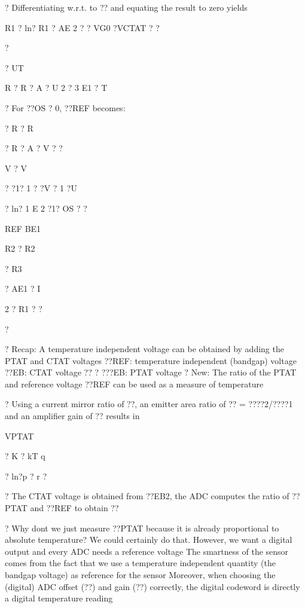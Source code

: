 \documentclass[2pt,landscape]{article}
\begin{document}
\begin{multicols*}{5}
?	Differentiating w.r.t. to ?? and equating the result to zero yields



R1 ? ln? R1 ? AE 2 ? ? VG0 ?VCTAT ? ?

? 


? UT


R	? R ? A	?	U
2	?	3	E1 ?	T



?	For ??OS ? 0, ??REF becomes:


?	R ?	R


? R ? A	?	V	? ?


V	? V


? ?1? 1 ? ?V	?   1 ?U



? ln?   1	E 2 ?1?	OS    ? ?


REF	BE1


R2 ?	R2


? R3


? AE1 ?	I


2 ? R1 ? ?




? 

?	Recap: A temperature independent voltage can be obtained by adding 
the PTAT and CTAT voltages
??REF: temperature independent (bandgap) voltage
??EB: CTAT voltage
?? ? ???EB: PTAT voltage
?	New: The ratio of the PTAT and reference voltage ??REF can be used as 
a measure of temperature




?	Using a current mirror ratio of ??, an emitter area ratio of ?? = ????2/????1
and an amplifier gain of ?? results in


VPTAT


? K ? kT
q


? ln?p ? r ?


?	The CTAT voltage is obtained from ??EB2, the ADC computes the ratio 
of ??PTAT and ??REF to obtain ??




?	Why don\textbullet t we just measure ??PTAT because it is already proportional to 
absolute temperature?
We could certainly do that. However, we want a digital output and 
every ADC needs a reference voltage
The smartness of the sensor comes from the fact that we use a 
temperature independent quantity (the bandgap voltage) as reference 
for the sensor
Moreover, when choosing the (digital) ADC offset (??) and gain (??) 
correctly, the digital codeword is directly a digital temperature reading







\end{multicols*}
\end{document}
